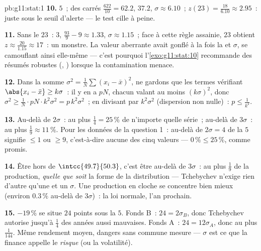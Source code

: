 \begin{solution}{pb:g11:stat:1}
\textbf{10.}  $5$~;  des carrés
$\frac{622}{10} = 62.2$,  $37.2$, $\sigma \approx 6.10$~;
$z(23) = \frac{18}{6.10} \approx 2.95$~: juste sous le seuil
d'alerte --- le test cille à peine.

\textbf{11.} Sans le $23$~:  $3$, 
$\frac{93}{9} - 9 \approx 1.33$, $\sigma \approx 1.15$~; face à
cette règle assainie, $23$ obtient
$z \approx \frac{20}{1.15} \approx 17$~: un monstre. La valeur
aberrante avait gonflé à la fois la  et $\sigma$, se
camouflant ainsi elle-même --- c'est pourquoi
l'\cref{exo:g11:stat:10} recommande des résumés robustes (,
) lorsque la contamination menace.

\textbf{12.} Dans la somme
$\sigma^2 = \frac1N \sum (x_i - \bar x)^2$, ne gardons que les
termes vérifiant $\abs{x_i - \bar x} \geq k\sigma$~: il y en a $pN$,
chacun valant au moins $(k\sigma)^2$, donc
$\sigma^2 \geq \frac{1}{N} \cdot pN \cdot k^2\sigma^2 =
p\,k^2\sigma^2$~; en divisant par $k^2 \sigma^2$ (dispersion non
nulle)~: $p \leq \frac{1}{k^2}$.

\textbf{13.} Au-delà de $2\sigma$~: au plus $\frac14 = 25\,\%$ de
n'importe quelle série~; au-delà de $3\sigma$~: au plus
$\frac19 \approx 11\,\%$. Pour les données de la question 1~:
au-delà de $2\sigma = 4$ de la  $5$ signifie $\leq 1$ ou
$\geq 9$, c'est-à-dire aucune des cinq valeurs ---
$0\,\% \leq 25\,\%$, comme promis.

\textbf{14.} Être hors de $\intcc{49.7}{50.3}$, c'est être au-delà
de $3\sigma$~: au plus $\frac19$ de la production, \emph{quelle que
soit} la forme de la distribution --- Tchebychev n'exige rien
d'autre qu'une  et un $\sigma$. Une production en cloche se
concentre bien mieux (environ $0.3\,\%$ au-delà de $3\sigma$)~: la
loi normale, l'an prochain.

\textbf{15.} $-19\,\%$ se situe $24$ points sous la  $5$.
Fonds B~: $24 = 2\sigma_B$, donc Tchebychev autorise jusqu'à
$\frac14$ des années aussi mauvaises. Fonds A~: $24 = 12\sigma_A$,
donc au plus $\frac{1}{144}$. Même rendement moyen, dangers sans
commune mesure --- $\sigma$ est ce que la finance appelle le
\emph{risque} (ou la volatilité).


\end{solution}

